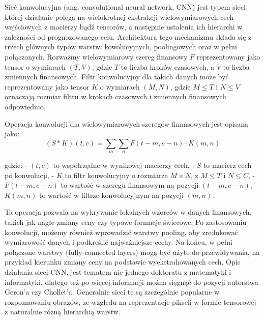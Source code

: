 \begin{enumerate}
  Sieć konwolucyjna (ang. convolutional neural network, CNN)
 jest typem sieci której działanie polega na wielokrotnej ekstrakcji wielowymiarowych cech wejściowych z macierzy bądź tensorów, a następnie ustalenia ich hierarchi w zależności od prognozowanego celu.
Architektura tego mechanizmu składa się z trzech głównych typów warstw: 
kowolucyjnych, poolingowych oraz w pełni połączonych. Rozważmy wielowymiarowy szereg finansowy $F$ reprezentowany jako tensor o wymiarach $(T, V)$, gdzie $T$ to liczba kroków czasowych, a $V$ to liczba zmiennych finansowych. Filtr konwolucyjny dla takich danych może być reprezentowany jako tensor $K$ o wymiarach $(M, N)$, gdzie $M \leq T$ i $N \leq V$ oznaczają rozmiar filtru w krokach czasowych i zmiennych finansowych odpowiednio.

Operacja konwolucji dla wielowymiarowych szeregów finansowych jest opisana jako:
$$
(S * K)(t, c) = \sum_{m}\sum_{n} F(t-m, c-n) \cdot K(m, n)
$$

gdzie:
- $(t, c)$ to współrzędne w wynikowej macierzy cech,
- $S$ to macierz cech po konwolucji,
- $K$ to filtr konwolucyjny o rozmiarze $M \times N$, z $M \leq T$ i $N \leq C$,
- $F(t-m, c-n)$ to wartość w szeregu finansowym na pozycji $(t-m, c-n)$,
- $K(m, n)$ to wartość w filtrze konwolucyjnym na pozycji $(m, n)$.

Ta operacja pozwala na wykrywanie lokalnych wzorców w danych finansowych, takich jak nagłe zmiany ceny czy typowe formacje świecowe.
Po zastosowaniu konwolucji, możemy również wprowadzić warstwy pooling, aby zredukować wymiarowość danych i podkreślić najważniejsze cechy.
Na końcu, w pełni połączone warstwy (fully-connected layers) mogą być użyte do przewidywania, na przykład kierunku zmiany ceny na podstawie wyekstrahowanych cech.
Opis działania sieci CNN, jest tematem nie jednego doktoratu z matematyki i informatyki, dlatego też po więcej informacji można sięgnąć do pozycji autorstwa Geron'a czy Chollet'a.
Generalnie sieci te są szczególnie popularne w rozpoznawaniu obrazów, ze względu na reprezentacje pikseli w formie tensorowej z naturalnie różną 
hierarchią warstw. 


\end{enumerate}
